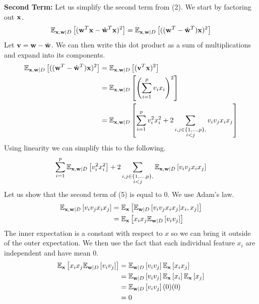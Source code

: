 \documentclass[submit]{harvardml}
\newcommand{\what}{\hat{\vb{w}}}
\newcommand{\E}{\mathbb{E}}
\begin{document}
\textbf{Second Term:} Let us simplify the second term from (2). We start by factoring out $\vb{x}$.
\begin{equation*}
    \E_{\vb{x}, \vb{w} | D}\left[(\vb{w}^T\vb{x} - \what^T \vb{x})^2\right] = \E_{\vb{x}, \vb{w} | D}\left[((\vb{w}^T - \what^T)\vb{x})^2\right]
\end{equation*}
Let $\vb{v} = \vb{w} - \what$. We can then write this dot product as a sum of multiplications and expand into its components.
\begin{align*}
    \E_{\vb{x}, \vb{w} | D}\left[((\vb{w}^T - \what^T)\vb{x})^2\right] &= \E_{\vb{x}, \vb{w} | D}\left[(\vb{v}^T \vb{x})^2\right]\\
    &= \E_{\vb{x}, \vb{w} | D}\left[\left(\sum_{i=1}^p v_i x_i\right)^2 \right] \\
    &= \E_{\vb{x}, \vb{w} | D}\left[\sum_{i=1}^p v_i^2 x_i^2 + 2 \sum_{\substack{i, j \in \{1,\dots,p\},\\ i < j}} v_i v_j x_i x_j \right]
\end{align*}
Using linearity we can simplify this to the following.
\begin{equation}
    \sum_{i=1}^p \E_{\vb{x}, \vb{w} | D}\left[ v_i^2 x_i^2\right] + 2 \sum_{\substack{i, j \in \{1,\dots,p\},\\ i < j}} \E_{\vb{x}, \vb{w} | D}\left[v_i v_j x_i x_j \right]
\end{equation}
Let us show that the second term of (5) is equal to $0$. We use Adam's law.
\begin{align*}
    \E_{\vb{x}, \vb{w} | D}\left[v_i v_j x_i x_j \right] &= \E_{\vb{x}} \left[ \E_{\vb{w} | D} \left[ v_i v_j x_i x_j | x_i, x_j \right]\right] \\
    &= \E_{\vb{x}} \left[ x_i x_j  \E_{\vb{w} | D} \left[ v_i v_j \right]\right]
\end{align*}
The inner expectation is a constant with respect to $x$ so we can bring it outside of the outer expectation. We then use the fact that each individual feature $x_i$ are independent and have mean $0$.
\begin{align*}
    \E_{\vb{x}} \left[ x_i x_j  \E_{\vb{w} | D} \left[ v_i v_j \right]\right] &= \E_{\vb{w} | D} \left[ v_i v_j \right] \E_{\vb{x}} \left[ x_i x_j  \right] \\
    &= \E_{\vb{w} | D} \left[ v_i v_j \right] \E_{\vb{x}} \left[ x_i  \right] \E_{\vb{x}} \left[ x_j  \right] \\
    &= \E_{\vb{w} | D} \left[ v_i v_j \right] (0) (0) \\
    &= 0
\end{align*}
\end{document}
